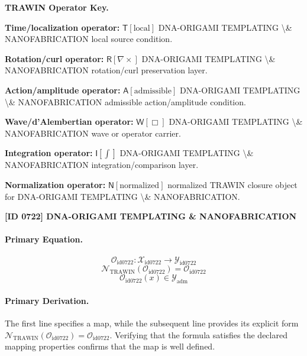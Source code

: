 \par\vspace{0.45\baselineskip}
\noindent\begin{minipage}[t]{\linewidth}
\begingroup
\small
\raggedright
\textbf{TRAWIN Operator Key.}\par
\noindent\textbf{Time/localization operator:} $\mathsf{T}\!\left[\mathrm{local}\right]$ DNA-ORIGAMI TEMPLATING \textbackslash{}\& NANOFABRICATION local source condition.\par
\noindent\textbf{Rotation/curl operator:} $\mathsf{R}\!\left[\nabla\times\right]$ DNA-ORIGAMI TEMPLATING \textbackslash{}\& NANOFABRICATION rotation/curl preservation layer.\par
\noindent\textbf{Action/amplitude operator:} $\mathsf{A}\!\left[\mathrm{admissible}\right]$ DNA-ORIGAMI TEMPLATING \textbackslash{}\& NANOFABRICATION admissible action/amplitude condition.\par
\noindent\textbf{Wave/d'Alembertian operator:} $\mathsf{W}\!\left[\Box\right]$ DNA-ORIGAMI TEMPLATING \textbackslash{}\& NANOFABRICATION wave or operator carrier.\par
\noindent\textbf{Integration operator:} $\mathsf{I}\!\left[\int\right]$ DNA-ORIGAMI TEMPLATING \textbackslash{}\& NANOFABRICATION integration/comparison layer.\par
\noindent\textbf{Normalization operator:} $\mathsf{N}\!\left[\mathrm{normalized}\right]$ normalized TRAWIN closure object for DNA-ORIGAMI TEMPLATING \textbackslash{}\& NANOFABRICATION.\par
\endgroup
\end{minipage}

\clearpage
\noindent\textbf{[ID 0722] DNA-ORIGAMI TEMPLATING \& NANOFABRICATION}\par
\vspace{0.35em}
\paragraph{Primary Equation.}
\[
\mathcal{O}_{\mathrm{id0722}}:\mathcal{X}_{\mathrm{id0722}}\longrightarrow\mathcal{Y}_{\mathrm{id0722}}
\]
\[
\mathcal{N}_{\mathrm{TRAWIN}}(\mathcal{O}_{\mathrm{id0722}})=\mathcal{O}_{\mathrm{id0722}}
\]
\[
\mathcal{O}_{\mathrm{id0722}}(x)\in\mathcal{Y}_{\mathrm{adm}}
\]

\paragraph{Primary Derivation.}
The first line specifies a map, while the subsequent line provides its explicit form \( \mathcal{N}_{\mathrm{TRAWIN}}(\mathcal{O}_{\mathrm{id0722}})=\mathcal{O}_{\mathrm{id0722}} \). Verifying that the formula satisfies the declared mapping properties confirms that the map is well defined.
